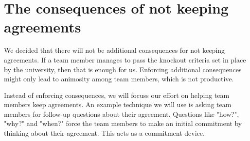 \section{The consequences of not keeping agreements}

We decided that there will not be additional consequences for not keeping
agreements.
If a team member manages to pass the knockout criteria set in place by the university,
then that is enough for us.
Enforcing additional consequences might only lead to animosity among team members,
which is not productive.

Instead of enforcing consequences, we will focuss our effort on helping team members keep agreements.
An example technique we will use is asking team members for follow-up questions about their agreement.
Questions like "how?", "why?" and "when?" force the team members to make an initial commitment by thinking about their agreement.
This acts as a commitment device.
